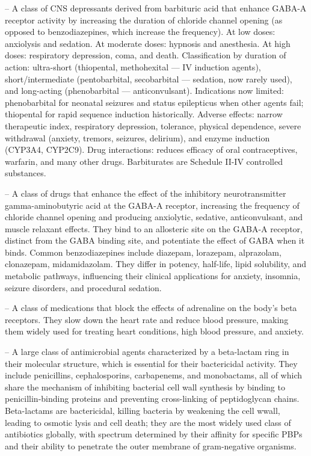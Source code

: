 -- A class of CNS depressants derived from barbituric acid that enhance GABA-A receptor activity by increasing the duration of chloride channel opening (as opposed to benzodiazepines, which increase the frequency). At low doses: anxiolysis and sedation. At moderate doses: hypnosis and anesthesia. At high doses: respiratory depression, coma, and death. Classification by duration of action: ultra-short (thiopental, methohexital — IV induction agents), short/intermediate (pentobarbital, secobarbital — sedation, now rarely used), and long-acting (phenobarbital — anticonvulsant). Indications now limited: phenobarbital for neonatal seizures and status epilepticus when other agents fail; thiopental for rapid sequence induction historically. Adverse effects: narrow therapeutic index, respiratory depression, tolerance, physical dependence, severe withdrawal (anxiety, tremors, seizures, delirium), and enzyme induction (CYP3A4, CYP2C9). Drug interactions: reduces efficacy of oral contraceptives, warfarin, and many other drugs. Barbiturates are Schedule II-IV controlled substances.

-- A class of drugs that enhance the effect of the inhibitory neurotransmitter gamma-aminobutyric acid at the GABA-A receptor, increasing the frequency of chloride channel opening and producing anxiolytic, sedative, anticonvulsant, and muscle relaxant effects. They bind to an allosteric site on the GABA-A receptor, distinct from the GABA binding site, and potentiate the effect of GABA when it binds. Common benzodiazepines include diazepam, lorazepam, alprazolam, clonazepam, midamidazolam. They differ in potency, half-life, lipid solubility, and metabolic pathways, influencing their clinical applications for anxiety, insomnia, seizure disorders, and procedural sedation.

-- A class of medications that block the effects of adrenaline on the body's beta receptors. They slow down the heart rate and reduce blood pressure, making them widely used for treating heart conditions, high blood pressure, and anxiety.

-- A large class of antimicrobial agents characterized by a beta-lactam ring in their molecular structure, which is essential for their bactericidal activity. They include penicillins, cephalosporins, carbapenems, and monobactams, all of which share the mechanism of inhibiting bacterial cell wall synthesis by binding to penicillin-binding proteins and preventing cross-linking of peptidoglycan chains. Beta-lactams are bactericidal, killing bacteria by weakening the cell wwall, leading to osmotic lysis and cell death; they are the most widely used class of antibiotics globally, with spectrum determined by their affinity for specific PBPs and their ability to penetrate the outer membrane of gram-negative organisms.

